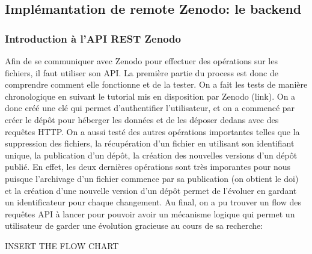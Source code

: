 \documentclass[11pt]{article}
\begin{document}
\subsection{Implémantation de remote Zenodo: le backend}
\label{sec:org0bdf26b}

\subsubsection{Introduction à l'API REST Zenodo}
\label{sec:orge10a23b}
Afin de se communiquer avec Zenodo pour effectuer des
opérations sur les fichiers, il faut utiliser son API. La première
partie du process est donc de comprendre comment elle fonctionne et de
la tester. On a fait les tests de manière chronologique en suivant le
tutorial mis en disposition par Zenodo (link). On a donc créé une clé
qui permet d'authentifier l'utilisateur, et on a commencé par créer le
dépôt pour héberger les données et de les déposer dedans avec des
requêtes HTTP. On a aussi testé des autres opérations importantes
telles que la suppression des fichiers, la récupération d'un fichier
en utilisant son identifiant unique, la publication d'un dépôt, la
création des nouvelles versions d'un dépôt publié. En effet, les deux
dernières opérations sont très imporantes pour nous puisque
l'archivage d'un fichier commence par sa publication (on obtient le
doi) et la création d'une nouvelle version d'un dépôt permet de
l'évoluer en gardant un identificateur pour chaque changement.
Au final, on a pu trouver un flow des requêtes API à lancer pour
pouvoir avoir un mécanisme logique qui permet un utilisateur de garder
une évolution gracieuse au cours de sa recherche:

INSERT THE FLOW CHART
\end{document}
